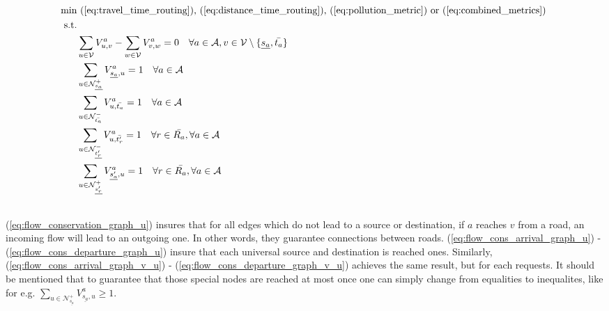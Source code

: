 \begin{align}
	\text{min}&  \text{
	(\ref{eq:travel_time_routing}), (\ref{eq:distance_time_routing}), (\ref{eq:pollution_metric}) or (\ref{eq:combined_metrics})
	}\nonumber\\
	\text{s.t.} &\nonumber\\
&\sum_{u \in \mathcal{V}} V^a_{u, v} - \sum_{w \in \mathcal{V}} V^a_{v, w} = 0 \quad \forall a \in \mathcal{A}, v \in \mathcal{V} \setminus \{\underline{s_a}, \bar{t_a}\} \label{eq:flow_conservation_graph_u} \\
&\sum_{ u \in \mathcal{N}^+_{\underline{s_a}} }V^a_{ \underline{s_a},u} = 1 \quad \forall a \in \mathcal{A} \label{eq:flow_cons_arrival_graph_u}\\
&\sum_{u \in \mathcal{N}^-_{\bar{t_a}} } V^a_{u, \bar{t_a}} = 1 \quad \forall a \in \mathcal{A} \label{eq:flow_cons_departure_graph_u}\\
&\sum_{u \in \mathcal{N}^-_{\underline{t'_r}} } V^a_{u, \bar{t'_r}} = 1 \quad \forall r \in \bar{R_a}, \forall a \in \mathcal{A} 	\label{eq:flow_cons_arrival_graph_v_u}\\
&\sum_{u \in \mathcal{N}^+_{\underline{s'_r}} } V^a_{ \underline{s'_a},u} = 1 \quad \forall r \in \bar{R_a}, \forall a \in \mathcal{A}\label{eq:flow_cons_departure_graph_v_u}\\
\nonumber
\end{align}
(\ref{eq:flow_conservation_graph_u}) insures that for all edges which do not lead to a source or destination, if $a$ reaches $v$ from a road, an incoming flow will lead to an outgoing one. In other words, they guarantee connections between roads. (\ref{eq:flow_cons_arrival_graph_u}) -  (\ref{eq:flow_cons_departure_graph_u}) insure that each universal source and destination is reached ones. Similarly, (\ref{eq:flow_cons_arrival_graph_v_u}) -  (\ref{eq:flow_cons_departure_graph_v_u}) achieves the same result, but for each requests.  It should be mentioned that to guarantee that those special nodes are reached at most once one can simply change from equalities to inequalites, like for e.g. $\sum_{ u \in \mathcal{N}^+_{\underline{s_a}} }V^a_{ \underline{s_a},u} \ge 1$.\\
